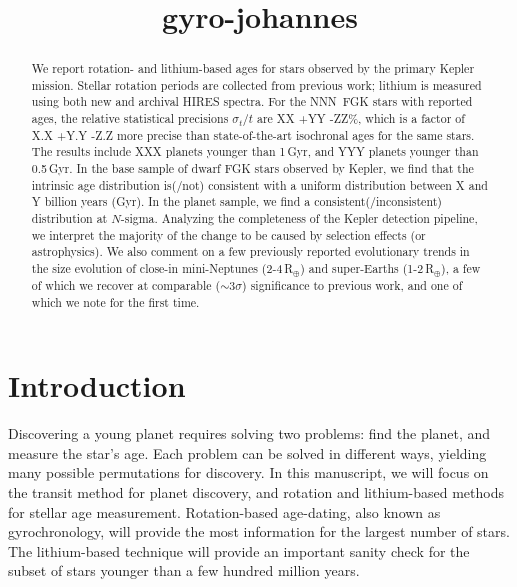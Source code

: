 \documentclass[12pt,twocolumn,tighten]{aastex63}
\newcommand{\rearth}{{R$_\oplus$}}
\newcommand{\nstarwithages}{NNN}
\begin{document}
\title{gyro-johannes}


\received{---}
\revised{---}
\accepted{---}




\begin{abstract}
  We report rotation- and lithium-based ages for stars observed by
  the primary Kepler mission.  Stellar rotation periods are collected from
  previous work; lithium is measured using both new and archival HIRES
  spectra.
  For the \nstarwithages\ FGK stars with reported ages, the relative statistical
  precisions $\sigma_t / t$ are XX +YY -ZZ\%, which is a factor of X.X
  +Y.Y -Z.Z more precise than state-of-the-art isochronal ages for the
  same stars.  The results include XXX planets younger than 1\,Gyr,
  and YYY planets younger than 0.5\,Gyr.
  In the base sample of dwarf FGK stars observed by
  Kepler, we find that the intrinsic age distribution is(/not)
  consistent with a uniform distribution between X and Y billion years
  (Gyr).  In the planet sample, we find a consistent(/inconsistent)
  distribution at $N$-sigma.  Analyzing the completeness of the Kepler
  detection pipeline, we interpret the majority of the change to be
  caused by selection effects (or astrophysics).  We also comment on a
  few previously reported evolutionary trends in the size evolution of
  close-in mini-Neptunes (2-4\,\rearth) and super-Earths
  (1-2\,\rearth), a few of which we recover at comparable
  ($\sim$3$\sigma$) significance to previous work, and one of which
  we note for the first time.
\end{abstract}


\section{Introduction}
\label{sec:intro}

Discovering a young planet requires solving two problems: find the
planet, and measure the star's age.  Each problem can be
solved in different ways, yielding many possible permutations for
discovery.  In this manuscript, we will focus on the transit method
for planet discovery, and rotation and lithium-based methods for stellar age
measurement.  Rotation-based age-dating, also known as
gyrochronology, will provide the most information for the largest
number of stars.  The lithium-based technique will provide an
important sanity check for the subset of stars younger than a few
hundred million years.
\end{document}
